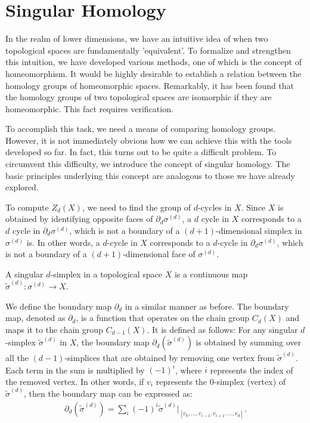 \section{Singular Homology}
\label{Singular Homology}
In the realm of lower dimensions, we have an intuitive idea of when two topological spaces are fundamentally 'equivalent'. To formalize and strengthen this intuition, we have developed various methods, one of which is the concept of homeomorphism. It would be highly desirable to establish a relation between the homology groups of homeomorphic spaces. Remarkably, it has been found that the homology groups of two topological spaces are isomorphic if they are homeomorphic. This fact requires verification.

To accomplish this task, we need a means of comparing homology groups. However, it is not immediately obvious how we can achieve this with the tools developed so far. In fact, this turns out to be quite a difficult problem. To circumvent this difficulty, we introduce the concept of singular homology. The basic principles underlying this concept are analogous to those we have already explored.

To compute \( Z_{d}(X) \), we need to find the group of \( d \)-cycles in \( X \). Since \( X \) is obtained by identifying opposite faces of \( \partial_{d} \sigma^{(d)} \), a \( d \) cycle in \( X \) corresponds to a \( d \) cycle in \( \partial_{d} \sigma^{(d)} \), which is not a boundary of a \( (d+1) \)-dimensional simplex in \( \sigma^{(d)} \) is. In other words, a \( d \)-cycle in \( X \) corresponds to a \( d \)-cycle in \( \partial_{d} \sigma^{(d)} \), which is not a boundary of a \( (d+1) \)-dimensional face of \( \sigma^{(d)} \).

\begin{definition}
A singular \( d \)-simplex in a topological space \( X \) is a continuous map \( \tilde{\sigma}^{(d)}: \sigma^{(d)} \to X \).
\end{definition}

We define the boundary map \( \partial_{d} \) in a similar manner as before. The boundary map, denoted as \( \partial_{d} \), is a function that operates on the chain group \( C_{d}(X) \) and maps it to the chain group \( C_{d-1}(X) \). It is defined as follows: For any singular \( d \)-simplex \( \tilde{\sigma}^{(d)} \) in \( X \), the boundary map \( \partial_{d}(\tilde{\sigma}^{(d)}) \) is obtained by summing over all the \( (d-1) \)-simplices that are obtained by removing one vertex from \( \tilde{\sigma}^{(d)} \). Each term in the sum is multiplied by \( (-1)^{i} \), where \( i \) represents the index of the removed vertex. In other words, if \( v_{i} \) represents the \( 0 \)-simplex (vertex) of \( \tilde{\sigma}^{(d)} \), then the boundary map can be expressed as:
\begin{align}
\partial_{d}(\tilde{\sigma}^{(d)}) = \sum_{i} (-1)^{i} \tilde{\sigma}^{(d)}\vert_{[v_0, \ldots, v_{i-1}, v_{i+1}, \ldots, v_d]}.
\end{align}

